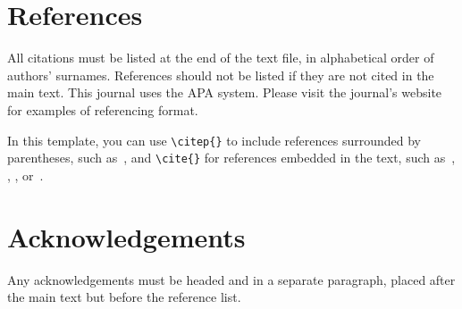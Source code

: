 \documentclass{article}
\begin{document}
\section{References}

All citations must be listed at the end of the text file,
in alphabetical order of authors' surnames.
References should not be listed if they are not cited in
the main text.
This journal uses the APA system.
Please visit the journal's website
for examples of referencing format.

In this template, you can use \verb=\citep{}= to include references
surrounded by parentheses, such as~\citep{KneesS16_MusicSimilarityRetrieval_SPRINGER}, and \verb=\cite{}=
for references embedded in the text,
such as~\cite{WeihsJVR16_MusicDataAnalysis_CRC},
\cite{SerraEtAl13_RoadmapMIR_CreativeCommon},
\cite{Lerch15_AudioContentAnalysis_WILEY},
or~\cite{Mueller15_FMP_SPRINGER}.



\section*{Acknowledgements}

Any acknowledgements must be headed and in a separate paragraph,
placed after the main text but before the reference list.




%
%
%
%
\end{document}
